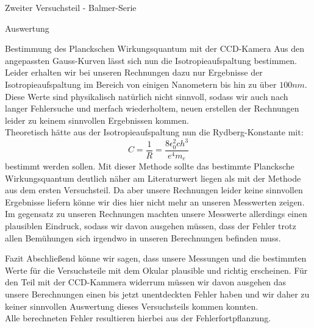 \documentclass[pdftex, a4paper,11pt, twoside, ngerman]{report}
\begin{document}
\begin{chapter}{Zweiter Versuchsteil - Balmer-Serie}
\begin{section}{Auswertung}
      \begin{subsection}{Bestimmung des Planckschen Wirkungsquantum mit der
          CCD-Kamera}
        \label{chp:Balmer:sec:Auswertung:subsec:CCD}
        Aus den angepassten Gauss-Kurven lässt sich nun die 
        Isotropieaufspaltung bestimmen. Leider erhalten wir bei unseren 
        Rechnungen dazu nur Ergebnisse der Isotropieaufspaltung im Bereich von
        einigen Nanometern bis hin zu über $100nm$. Diese Werte sind 
        physikalisch natürlich nicht sinnvoll, sodass wir auch nach langer
        Fehlersuche und merfach wiederholtem, neuen erstellen der Rechnungen 
        leider zu keinem sinnvollen Ergebnissen kommen. \\
        Theoretisch hätte aus der Isotropieaufspaltung nun die 
        Rydberg-Konstante mit:
        \begin{equation}
          C = \frac{1}{R}=\frac{8\epsilon_0^2ch^3}{e^4m_e}
        \end{equation}
        bestimmt werden sollen. Mit dieser Methode sollte das bestimmte 
        Plancksche Wirkungsquantum deutlich näher am Literaturwert liegen als 
        mit der Methode aus dem ersten Versuchsteil. Da aber unsere Rechnungen
        leider keine sinnvollen Ergebnisse liefern könne wir dies hier nicht 
        mehr an unseren Messwerten zeigen. Im gegensatz zu unseren Rechnungen 
        machten unsere Messwerte allerdings einen plausiblen Eindruck, sodass 
        wir davon ausgehen müssen, dass der Fehler trotz allen Bemühungen sich
        irgendwo in unseren Berechnungen befinden muss. 
        
      \end{subsection}
      
    \end{section}
   
   
   
    \begin{section}{Fazit}
      \label{chp:Balmer:sec:Fazit}
      Abschließend könne wir sagen, dass unsere Messungen und die bestimmten
      Werte für die Versuchsteile mit dem Okular plausible und richtig 
      erscheinen. Für den Teil mit der CCD-Kammera widerrum müssen wir davon 
      ausgehen das unsere Berechnungen einen bis jetzt unentdeckten Fehler 
      haben und wir daher zu keiner sinnvollen Auswertung dieses Versuchsteils 
      kommen konnten. \\
      
      Alle berechneten Fehler resultieren hierbei aus der Fehlerfortpflanzung.
      
    \end{section}
   
  \end{chapter}
  
\end{document}
